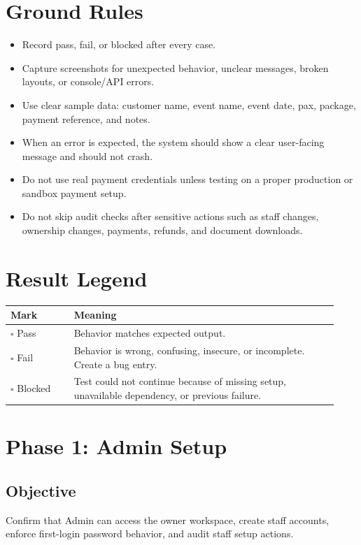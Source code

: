 \documentclass[11pt,a4paper]{article}
\newcommand{\passbox}{\(\square\) Pass}
\newcommand{\failbox}{\(\square\) Fail}
\newcommand{\blockedbox}{\(\square\) Blocked}
\begin{document}
\section{Ground Rules}
\begin{itemize}
  \item Record pass, fail, or blocked after every case.
  \item Capture screenshots for unexpected behavior, unclear messages, broken layouts, or console/API errors.
  \item Use clear sample data: customer name, event name, event date, pax, package, payment reference, and notes.
  \item When an error is expected, the system should show a clear user-facing message and should not crash.
  \item Do not use real payment credentials unless testing on a proper production or sandbox payment setup.
  \item Do not skip audit checks after sensitive actions such as staff changes, ownership changes, payments, refunds, and document downloads.
\end{itemize}

\section{Result Legend}
\begin{longtable}{p{0.18\linewidth}p{0.75\linewidth}}
\toprule
\textbf{Mark} & \textbf{Meaning} \\
\midrule
\passbox & Behavior matches expected output. \\
\failbox & Behavior is wrong, confusing, insecure, or incomplete. Create a bug entry. \\
\blockedbox & Test could not continue because of missing setup, unavailable dependency, or previous failure. \\
\bottomrule
\end{longtable}

\newpage

\section{Phase 1: Admin Setup}
\subsection{Objective}
Confirm that Admin can access the owner workspace, create staff accounts, enforce first-login password behavior, and audit staff setup actions.
\end{document}
